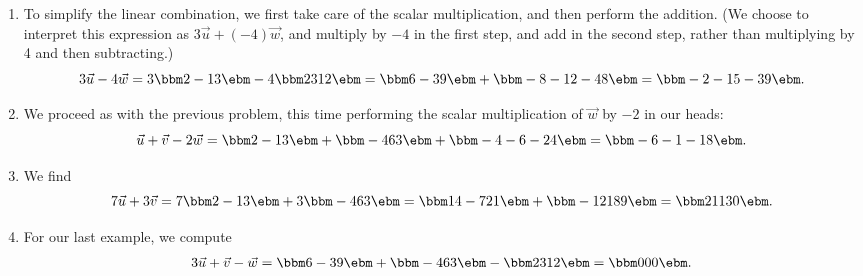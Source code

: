 {\begin{enumerate}
\item To simplify the linear combination, we first take care of the scalar multiplication, and then perform the addition. (We choose to interpret this expression as $3\vec{u}+(-4)\vec{w}$, and multiply by $-4$ in the first step, and add in the second step, rather than multiplying by 4 and then subtracting.)
\[
3\vec{u}-4\vec{w}  = 3\bbm 2\\-1\\3\ebm -4\bbm 2\\3\\12\ebm
 = \bbm 6\\-3\\9\ebm + \bbm -8\\-12\\-48\ebm
 = \bbm -2\\-15\\-39\ebm.
\]

\item We proceed as with the previous problem, this time performing the scalar multiplication of $\vec{w}$ by $-2$ in our heads:
\[
\vec{u}+\vec{v}-2\vec{w}  = \bbm 2\\-1\\3\ebm + \bbm -4\\6\\3\ebm + \bbm -4\\-6\\-24\ebm = \bbm -6\\-1\\-18\ebm.
\]

\item We find
\[
7\vec{u}+3\vec{v} = 7\bbm 2\\-1\\3\ebm+3\bbm -4\\6\\3\ebm = 
\bbm 14\\-7\\21\ebm+\bbm -12\\18\\9\ebm = \bbm 2\\11\\30\ebm.
\]

\item For our last example, we compute
\[
3\vec{u}+\vec{v}-\vec{w} = \bbm 6\\-3\\9\ebm + \bbm -4\\6\\3\ebm - \bbm 2\\3\\12\ebm = \bbm 0\\0\\0\ebm.
\]
\end{enumerate}
}

